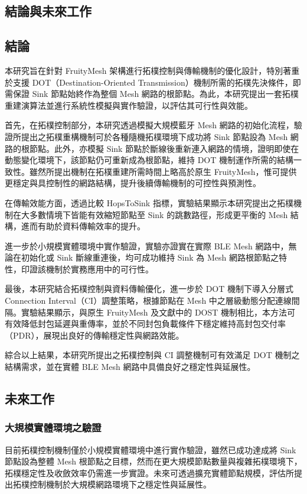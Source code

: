 \begin{ZhChapter}

\chapter{結論與未來工作}

\section{結論}
本研究旨在針對 FruityMesh 架構進行拓樸控制與傳輸機制的優化設計，特別著重於支援 DOT（Destination-Oriented Transmission）機制所需的拓樸先決條件，即需保證 Sink 節點始終作為整個 Mesh 網路的根節點。為此，本研究提出一套拓樸重建演算法並進行系統性模擬與實作驗證，以評估其可行性與效能。

首先，在拓樸控制部分，本研究透過模擬大規模藍牙 Mesh 網路的初始化流程，驗證所提出之拓樸重構機制可於各種隨機拓樸環境下成功將 Sink 節點設為 Mesh 網路的根節點。此外，亦模擬 Sink 節點於斷線後重新連入網路的情境，證明即使在動態變化環境下，該節點仍可重新成為根節點，維持 DOT 機制運作所需的結構一致性。雖然所提出機制在拓樸重建所需時間上略高於原生 FruityMesh，惟可提供更穩定與具控制性的網路結構，提升後續傳輸機制的可控性與預測性。

在傳輸效能方面，透過比較 HopsToSink 指標，實驗結果顯示本研究提出之拓樸機制在大多數情境下皆能有效縮短節點至 Sink 的跳數路徑，形成更平衡的 Mesh 結構，進而有助於資料傳輸效率的提升。

進一步於小規模實體環境中實作驗證，實驗亦證實在實際 BLE Mesh 網路中，無論在初始化或 Sink 斷線重連後，均可成功維持 Sink 為 Mesh 網路根節點之特性，印證該機制於實務應用中的可行性。

最後，本研究結合拓樸控制與資料傳輸優化，進一步於 DOT 機制下導入分層式 Connection Interval（CI）調整策略，根據節點在 Mesh 中之層級動態分配連線間隔。實驗結果顯示，與原生 FruityMesh 及文獻中的 DOST 機制相比，本方法可有效降低封包延遲與重傳率，並於不同封包負載條件下穩定維持高封包交付率（PDR），展現出良好的傳輸穩定性與網路效能。

綜合以上結果，本研究所提出之拓樸控制與 CI 調整機制可有效滿足 DOT 機制之結構需求，並在實體 BLE Mesh 網路中具備良好之穩定性與延展性。

\section{未來工作}
\subsection{大規模實體環境之驗證}
目前拓樸控制機制僅於小規模實體環境中進行實作驗證，雖然已成功達成將 Sink 節點設為整體 Mesh 根節點之目標，然而在更大規模節點數量與複雜拓樸環境下，拓樸穩定性及收斂效率仍需進一步實證。未來可透過擴充實體節點規模，評估所提出拓樸控制機制於大規模網路環境下之穩定性與延展性。


\end{ZhChapter}
